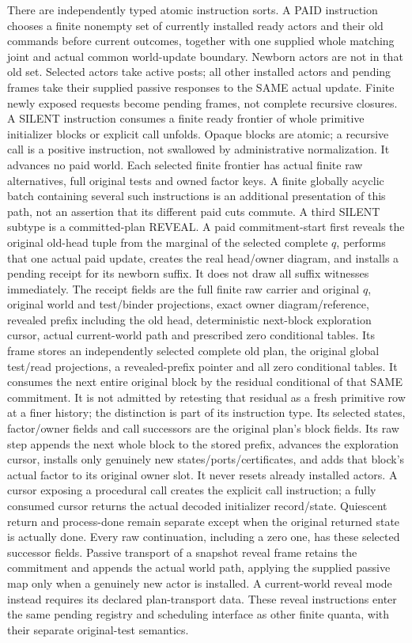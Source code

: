 \documentclass[11pt]{article}\usepackage{amsmath,amssymb,amsthm}
\begin{document}
There are independently typed atomic instruction sorts. A PAID instruction chooses a finite nonempty set of currently installed ready actors and their old commands before current outcomes, together with one supplied whole matching joint and actual common world-update boundary. Newborn actors are not in that old set. Selected actors take active posts; all other installed actors and pending frames take their supplied passive responses to the SAME actual update. Finite newly exposed requests become pending frames, not complete recursive closures. A SILENT instruction consumes a finite ready frontier of whole primitive initializer blocks or explicit call unfolds. Opaque blocks are atomic; a recursive call is a positive instruction, not swallowed by administrative normalization. It advances no paid world. Each selected finite frontier has actual finite raw alternatives, full original tests and owned factor keys. A finite globally acyclic batch containing several such instructions is an additional presentation of this path, not an assertion that its different paid cuts commute. A third SILENT subtype is a committed-plan REVEAL. A paid commitment-start first reveals the original old-head tuple from the marginal of the selected complete $q$, performs that one actual paid update, creates the real head/owner diagram, and installs a pending receipt for its newborn suffix. It does not draw all suffix witnesses immediately. The receipt fields are the full finite raw carrier and original $q$, original world and test/binder projections, exact owner diagram/reference, revealed prefix including the old head, deterministic next-block exploration cursor, actual current-world path and prescribed zero conditional tables.  Its frame stores an independently selected complete old plan, the original global test/read projections, a revealed-prefix pointer and all zero conditional tables. It consumes the next entire original block by the residual conditional of that SAME commitment. It is not admitted by retesting that residual as a fresh primitive row at a finer history; the distinction is part of its instruction type. Its selected states, factor/owner fields and call successors are the original plan's block fields. Its raw step appends the next whole block to the stored prefix, advances the exploration cursor, installs only genuinely new states/ports/certificates, and adds that block's actual factor to its original owner slot. It never resets already installed actors. A cursor exposing a procedural call creates the explicit call instruction; a fully consumed cursor returns the actual decoded initializer record/state. Quiescent return and process-done remain separate except when the original returned state is actually done. Every raw continuation, including a zero one, has these selected successor fields. Passive transport of a snapshot reveal frame retains the commitment and appends the actual world path, applying the supplied passive map only when a genuinely new actor is installed. A current-world reveal mode instead requires its declared plan-transport data. These reveal instructions enter the same pending registry and scheduling interface as other finite quanta, with their separate original-test semantics.
\end{document}
